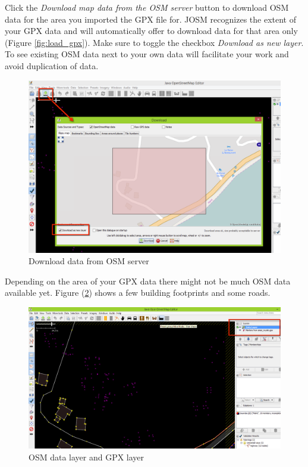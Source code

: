 \documentclass[a4paper,12pt,titlepage]{article}
\begin{document}
Click the \textit{Download map data from the OSM server} button to download OSM data for the area you imported the GPX file for. JOSM recognizes the extent of your GPX data and will automatically offer to download data for that area only (Figure \ref{fig:load_gpx}). Make sure to toggle the checkbox \textit{Download as new layer}. To see existing OSM data next to your own data will facilitate your work and avoid duplication of data.  

\begin{figure}[H]
	\centering
	\includegraphics[width=12cm]{Images/load_gpx_file_2.png}
	\caption{Download data from OSM server}\label{fig:load_gpx_2}
\end{figure}

Depending on the area of your GPX data there might not be much OSM data available yet. Figure (\ref*{fig:load_gpx_3}) shows a few building footprints and some roads.

\begin{figure}[H]
	\centering
	\includegraphics[width=12cm]{Images/load_gpx_file_3.png}
	\caption{OSM data layer and GPX layer}\label{fig:load_gpx_3}
\end{figure}
\end{document}
